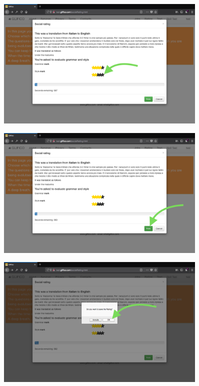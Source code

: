 \documentclass[11 pt, a4paper]{article}
\begin{document}
\begin{figure}[H]
\centering
\includegraphics[width=0.9\textwidth]{translator_socialrating5.png}
\end{figure}


\clearpage
\begin{figure}[H]
\centering
\includegraphics[width=0.9\textwidth]{translator_socialrating6.png}
\end{figure}


\begin{figure}[H]
\centering
\includegraphics[width=0.9\textwidth]{translator_socialrating7.png}
\end{figure}
\end{document}
